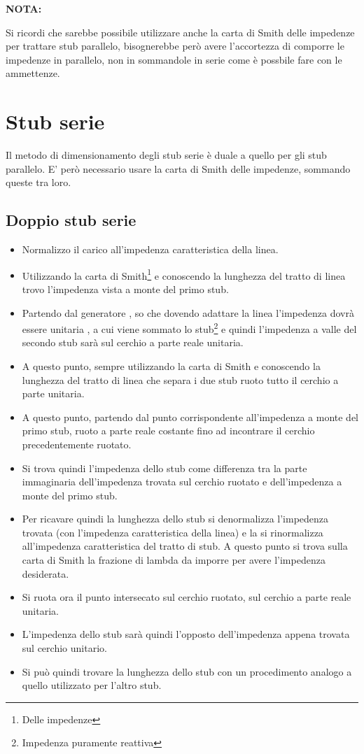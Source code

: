 \documentclass[10pt,a4paper]{report}
\begin{document}
	\textbf{NOTA:}

	Si ricordi che sarebbe possibile utilizzare anche la carta di Smith delle impedenze per trattare stub parallelo, bisognerebbe però avere l'accortezza di comporre le impedenze in parallelo, non in sommandole in serie come è possbile fare con le ammettenze.

	
	\section{Stub serie}

	 	Il metodo di dimensionamento degli stub serie è duale a quello per gli stub parallelo. E' però necessario usare la carta di Smith delle impedenze, sommando queste tra loro.

		\subsection{Doppio stub serie}

			\begin{itemize}

			\item Normalizzo il carico all'impedenza caratteristica della linea.
			\item Utilizzando la carta di Smith\footnote{Delle impedenze} e conoscendo la lunghezza del tratto di linea trovo l'impedenza vista a monte del primo stub.  
			\item Partendo dal generatore , so che dovendo adattare la linea l'impedenza dovrà essere unitaria , a cui viene sommato lo stub\footnote{Impedenza puramente reattiva} e quindi l'impedenza a valle del secondo stub sarà sul cerchio a parte reale unitaria.  
			\item A questo punto, sempre utilizzando la carta di Smith e conoscendo la lunghezza del tratto di linea che separa i due stub ruoto tutto il cerchio a parte unitaria.
			\item A questo punto, partendo dal punto corrispondente all'impedenza a monte del primo stub, ruoto a parte reale costante fino ad incontrare il cerchio precedentemente ruotato.
			\item Si trova quindi l'impedenza dello stub come differenza tra la parte immaginaria dell'impedenza trovata sul cerchio ruotato e dell'impedenza a monte del primo stub. 
			\item Per ricavare quindi la lunghezza dello stub si denormalizza l'impedenza trovata (con l'impedenza caratteristica della linea) e la si rinormalizza all'impedenza caratteristica del tratto di stub. A questo punto si trova sulla carta di Smith la frazione di lambda da imporre per avere l'impedenza desiderata.  
			\item Si ruota ora il punto intersecato sul cerchio ruotato, sul cerchio a parte reale unitaria.
			\item L'impedenza dello stub sarà quindi l'opposto dell'impedenza appena trovata sul cerchio unitario.
			\item Si può quindi trovare la lunghezza dello stub con un procedimento analogo a quello utilizzato per l'altro stub.
			
			\end{itemize}
\end{document}

